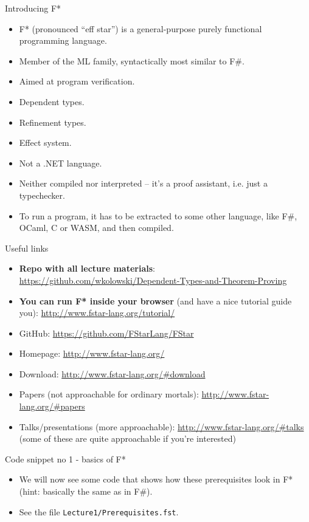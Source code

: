 \documentclass{beamer}
\begin{document}
\frame{\tableofcontents}

\begin{frame}{Introducing F*}
\begin{itemize}
	\item F* (pronounced ``eff star'') is a general-purpose purely functional programming language.
	\item Member of the ML family, syntactically most similar to F\#.
	\item Aimed at program verification.
	\item Dependent types.
	\item Refinement types.
	\item Effect system.
	\item Not a .NET language.
	\item Neither compiled nor interpreted -- it's a proof assistant, i.e. just a typechecker.
	\item To run a program, it has to be extracted to some other language, like F\#, OCaml, C or WASM, and then compiled.
\end{itemize}
\end{frame}

\begin{frame}{Useful links}
\begin{itemize}
	\item \textbf{Repo with all lecture materials}: \url{https://github.com/wkolowski/Dependent-Types-and-Theorem-Proving}
	\item \textbf{You can run F* inside your browser} (and have a nice tutorial guide you): \url{http://www.fstar-lang.org/tutorial/}
	\item GitHub: \url{https://github.com/FStarLang/FStar}
	\item Homepage: \url{http://www.fstar-lang.org/}
	\item Download: \url{http://www.fstar-lang.org/\#download}
	\item Papers (not approachable for ordinary mortals): \url{http://www.fstar-lang.org/\#papers}
	\item Talks/presentations (more approachable): \url{http://www.fstar-lang.org/\#talks} (some of these are quite approachable if you're interested)  
\end{itemize}
\end{frame}

\begin{frame}{Code snippet no 1 - basics of F*}
\begin{itemize}
	\item We will now see some code that shows how these prerequisites look in F* (hint: basically the same as in F\#).
	\item See the file \texttt{Lecture1/Prerequisites.fst}.
\end{itemize}
\end{frame}
\end{document}
